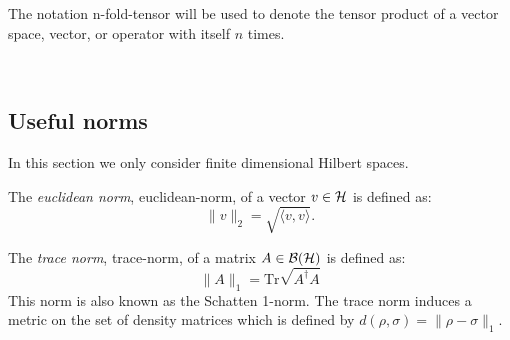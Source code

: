 The notation \gls{n-fold-tensor}  will be used to  denote the tensor product of a vector space, vector, or operator with itself $n$ times.



\



\subsection{Useful norms }
In this section we only consider finite dimensional Hilbert spaces.

\begin{definition} \label{eq:euclidean_distance}
  The \emph{euclidean norm}, \gls{euclidean-norm}, of a vector $v \in \mathcal{H} $ is defined as:
  \begin{equation*}
    \lVert v \rVert_{2} = \sqrt{\langle v, v\rangle}. 
    \end{equation*}
\end{definition}


\begin{definition}\label{def:trace-norm-matriz}
  The \emph{trace norm}, \gls{trace-norm}, of a matrix $A \in \mathcal{B}(\mathcal{H})$ is defined as:
  \begin{equation*} \label{eq:trace_norm_matrix_tr}
    \lVert A \rVert_{1} = \text{Tr} \sqrt{A^{\dagger}A}
  \end{equation*}
  This norm is also  known as the Schatten 1-norm. The trace norm induces a metric on the set of density matrices which is defined by $d(\rho, \sigma) = \lVert \rho -\sigma\rVert_{1}$.
\end{definition}

